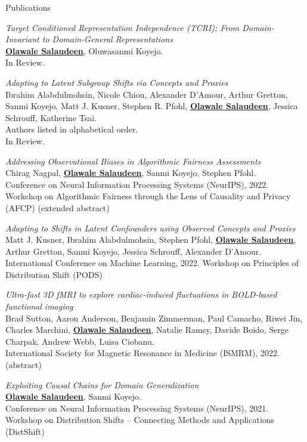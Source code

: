 \documentclass{resume} %
\begin{document}
\begin{rSection}{Publications}
\begin{etaremune}[label={\arabic*.}]

\item \emph{Target Conditioned Representation Independence (TCRI); From Domain-Invariant to Domain-General Representations}\\
\textbf{\underline{Olawale Salaudeen}}, Oluwasanmi Koyejo.\\
In Review.

\item \emph{Adapting to Latent Subgroup Shifts via Concepts and Proxies}\\
Ibrahim Alabdulmohsin, Nicole Chiou, Alexander D'Amour, Arthur Gretton, 
Sanmi Koyejo, Matt J. Kusner, Stephen R. Pfohl, 
\textbf{\underline{Olawale Salaudeen}}, Jessica Schrouff, Katherine Tsai.\\
Authors listed in alphabetical order.\\
In Review.

\item \emph{Addressing Observational Biases in Algorithmic Fairness
Assessments}\\
Chirag Nagpal, \textbf{\underline{Olawale Salaudeen}}, Sanmi Koyejo, Stephen
Pfohl.\\
Conference on Neural Information Processing Systems (NeurIPS), 2022. Workshop
on Algorithmic Fairness through the Lens of Causality and Privacy (AFCP)
(extended abstract)

\item \emph{Adapting to Shifts in Latent Confounders using Observed
Concepts and Proxies}\\
Matt J. Kusner, Ibrahim Alabdulmohsin, Stephen Pfohl, \textbf{\underline{Olawale Salaudeen}},
Arthur Gretton, Sanmi Koyejo, Jessica Schrouff, Alexander D’Amour.\\
International Conference on Machine Learning, 2022. Workshop on Principles of Distribution Shift (PODS)

\item \emph{Ultra-fast 3D fMRI to explore cardiac-induced fluctuations
in BOLD-based functional imaging}\\
Brad Sutton, Aaron Anderson, Benjamin Zimmerman, Paul Camacho, Riwei Jin, Charles Marchini,
\textbf{\underline{Olawale Salaudeen}}, Natalie Ramsy, Davide Boido, Serge
Charpak, Andrew Webb, Luisa Ciobanu.\\
International Society for Magnetic Resonance in Medicine (ISMRM), 2022. (abstract)

\item \emph{Exploiting Causal Chains for Domain Generalization}\\
\textbf{\underline{Olawale Salaudeen}}, Sanmi Koyejo.\\
Conference on Neural Information Processing Systems (NeurIPS), 2021. Workshop on Distribution Shifts -- Connecting Methods and Applications (DistShift)
\end{etaremune}
\end{rSection}
\end{document}
